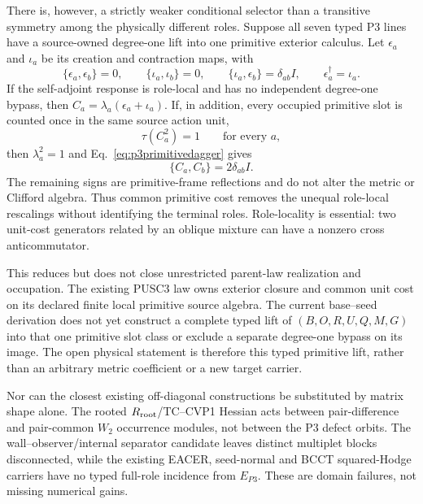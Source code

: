 There is, however, a strictly weaker conditional selector than a transitive
symmetry among the physically different roles.  Suppose all seven typed P3
lines have a source-owned degree-one lift into one primitive exterior
calculus.  Let $\epsilon_a$ and $\iota_a$ be its creation and contraction
maps, with
\begin{equation}
\{\epsilon_a,\epsilon_b\}=0,\qquad
\{\iota_a,\iota_b\}=0,\qquad
\{\iota_a,\epsilon_b\}=\delta_{ab}I,\qquad
\epsilon_a^\dagger=\iota_a.
\label{eq:p3primitivedagger}
\end{equation}
If the self-adjoint response is role-local and has no independent
degree-one bypass, then
$C_a=\lambda_a(\epsilon_a+\iota_a)$.  If, in addition, every occupied
primitive slot is counted once in the same source action unit,
\begin{equation}
\tau(C_a^2)=1\qquad\text{for every }a,
\label{eq:p3primitiveunitcost}
\end{equation}
then $\lambda_a^2=1$ and Eq.~\eqref{eq:p3primitivedagger} gives
\begin{equation}
\boxed{\{C_a,C_b\}=2\delta_{ab}I.}
\label{eq:p3primitiveselector}
\end{equation}
The remaining signs are primitive-frame reflections and do not alter the
metric or Clifford algebra.  Thus common primitive cost removes the unequal
role-local rescalings without identifying the terminal roles.  Role-locality
is essential: two unit-cost generators related by an oblique mixture can
have a nonzero cross anticommutator.

This reduces but does not close unrestricted parent-law realization and
occupation.  The existing PUSC3 law
owns exterior closure and common unit cost on its declared finite local
primitive source algebra.  The current base--seed derivation does not yet
construct a complete typed lift of $(B,O,R,U,Q,M,G)$ into that one primitive
slot class or exclude a separate degree-one bypass on its image.  The open
physical statement is therefore this typed primitive lift, rather than an
arbitrary metric coefficient or a new target carrier.

Nor can the closest existing off-diagonal constructions be substituted by
matrix shape alone.  The rooted $R_{\rm root}$/TC--CVP1 Hessian acts between
pair-difference and pair-common $W_2$ occurrence modules, not between the P3
defect orbits.  The wall--observer/internal separator candidate leaves
distinct multiplet blocks disconnected, while the existing EACER,
seed-normal and BCCT squared-Hodge carriers have no typed full-role incidence
from $E_{P3}$.  These are domain failures, not missing numerical gains.


